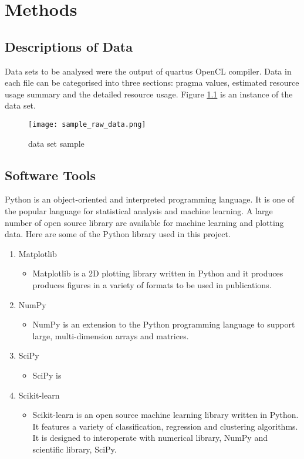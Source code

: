 \chapter{Methods}

\section{Descriptions of Data}
Data sets to be analysed were the output of quartus OpenCL compiler. Data in each file can be categorised into three sections: pragma values, estimated resource usage summary and the detailed resource usage. Figure \ref{figure:sample_raw_data} is an instance of the data set.

\begin{figure}[h!]
\centering
\texttt{[image: sample\_raw\_data.png]}
\caption{data set sample}
\label{figure:sample_raw_data}
\end{figure}

\section{Software Tools}
Python\citep{Rossum:1995:PRM:869369} is an object-oriented and interpreted programming language. It is one of the popular language for statistical analysis and machine learning. A large number of open source library are available for machine learning and plotting data. Here are some of the Python library used in this project.

\begin{enumerate}
    \item Matplotlib
        \begin{itemize}
            \item Matplotlib \citep{Hunter:2007} is a 2D plotting library written in Python and it produces produces figures in a variety of formats to be used in publications.
        \end{itemize}
    \item NumPy
        \begin{itemize}
            \item NumPy \citep{developersnumpy} is an extension to the Python programming language to support large, multi-dimension arrays and matrices.
        \end{itemize}
    \item SciPy
        \begin{itemize}
            \item SciPy is 
        \end{itemize}
    \item Scikit-learn
        \begin{itemize}
            \item Scikit-learn \citep{scikit-learn} is an open source machine learning library written in Python. It features a variety of classification, regression and clustering algorithms. It is designed to interoperate with numerical library, NumPy and scientific library, SciPy.
        \end{itemize}
\end{enumerate}

